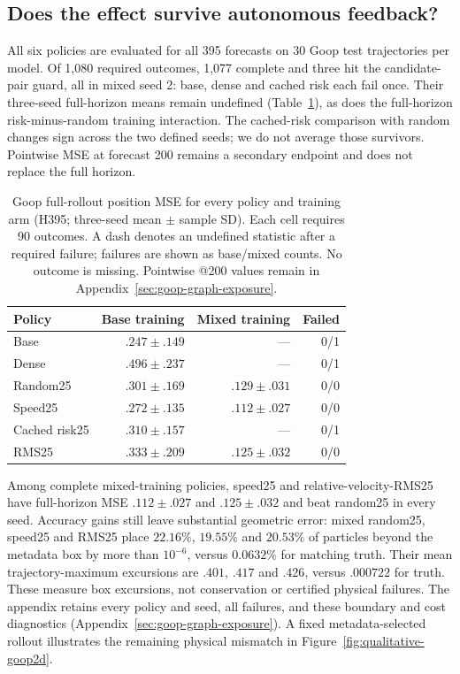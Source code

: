\subsection{Does the effect survive autonomous feedback?}
All six policies are evaluated for all 395 forecasts on 30 Goop test trajectories per model. Of 1,080 required outcomes, 1,077 complete and three hit the candidate-pair guard, all in mixed seed 2: base, dense and cached risk each fail once. Their three-seed full-horizon means remain undefined (Table~\ref{tab:goop-rollouts}), as does the full-horizon risk-minus-random training interaction. The cached-risk comparison with random changes sign across the two defined seeds; we do not average those survivors. Pointwise MSE at forecast 200 remains a secondary endpoint and does not replace the full horizon.

\begin{table}[t]
\centering\scriptsize
\caption{Goop full-rollout position MSE for every policy and training arm (H395; three-seed mean $\pm$ sample SD). Each cell requires 90 outcomes. A dash denotes an undefined statistic after a required failure; failures are shown as base/mixed counts. No outcome is missing. Pointwise @200 values remain in Appendix~\ref{sec:goop-graph-exposure}.}
\label{tab:goop-rollouts}
\setlength{\tabcolsep}{3pt}
\begin{tabular}{lrrr}
\toprule
Policy & Base training & Mixed training & Failed\\
\midrule
Base & $.247\pm.149$ & --- & 0/1\\
Dense & $.496\pm.237$ & --- & 0/1\\
Random25 & $.301\pm.169$ & $.129\pm.031$ & 0/0\\
Speed25 & $.272\pm.135$ & $.112\pm.027$ & 0/0\\
Cached risk25 & $.310\pm.157$ & --- & 0/1\\
RMS25 & $.333\pm.209$ & $.125\pm.032$ & 0/0\\
\bottomrule
\end{tabular}
\end{table}

Among complete mixed-training policies, speed25 and relative-velocity-RMS25 have full-horizon MSE $.112\pm.027$ and $.125\pm.032$ and beat random25 in every seed. Accuracy gains still leave substantial geometric error: mixed random25, speed25 and RMS25 place $22.16\%$, $19.55\%$ and $20.53\%$ of particles beyond the metadata box by more than $10^{-6}$, versus $0.0632\%$ for matching truth. Their mean trajectory-maximum excursions are $.401$, $.417$ and $.426$, versus $.000722$ for truth. These measure box excursions, not conservation or certified physical failures. The appendix retains every policy and seed, all failures, and these boundary and cost diagnostics (Appendix~\ref{sec:goop-graph-exposure}). A fixed metadata-selected rollout illustrates the remaining physical mismatch in Figure~\ref{fig:qualitative-goop2d}.

